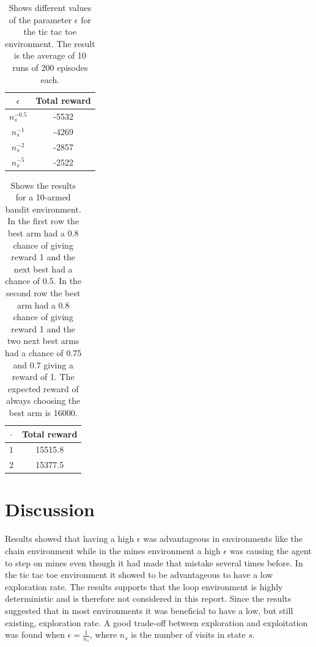 \documentclass[11pt]{article}
\numberwithin{equation}{section}
\begin{document}
\begin{flushleft}
\begin{table}[H]
\caption{Shows different values of the parameter $\epsilon$ for the tic tac toe environment. The result is the average of 10 runs of 200 episodes each.}
\begin{center}
\begin{tabular}{|c|c|}
\hline
$\epsilon$ & Total reward \\ \hline
$n_s^{-0.5}$ & -5532 \\ \hline
$n_s^{-1}$ & -4269 \\ \hline
$n_s^{-2}$ & -2857 \\ \hline
$n_s^{-5}$ & -2522 \\
\hline
\end{tabular}
\label{tab:tttMean}
\end{center}
\end{table}

\begin{table}[H]
\caption{Shows the results for a 10-armed bandit environment. In the first row the best arm had a 0.8 chance of giving reward 1 and the next best had a chance of 0.5. In the second row the best arm had a 0.8 chance of giving reward 1 and the two next best arms had a chance of 0.75 and 0.7 giving a reward of 1. The expected reward of always choosing the best arm is 16000.}
\begin{center}
\begin{tabular}{|c|c|}
\hline
$\cdot$ & Total reward \\ \hline
$1$ & 15515.8 \\ \hline
$2$ & 15377.5 \\
\hline
\end{tabular}
\label{tab:UCBMean}
\end{center}
\end{table}

\section{Discussion}

Results showed that having a high $\epsilon$ was advantageous in environments like the chain environment while in the mines environment a high $\epsilon$ was causing the agent to step on mines even though it had made that mistake several times before. In the tic tac toe environment it showed to be advantageous to have a low exploration rate. The results supports that the loop environment is highly deterministic and is therefore not considered in this report. Since the results suggested that in most environments it was beneficial to have a low, but still existing, exploration rate. A good trade-off between exploration and exploitation was found when $\epsilon = \frac{1}{n_s}$, where $n_s$ is the number of visits in state $s$. \newline 


\end{flushleft}
\end{document}
